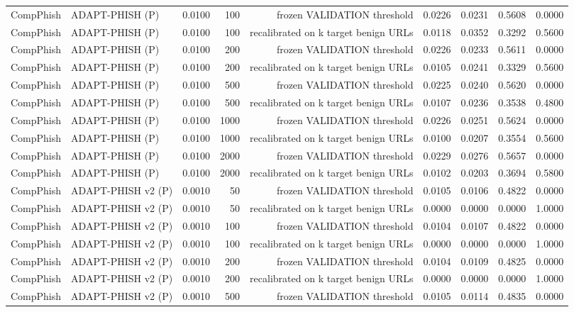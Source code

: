 \begin{table}[t]
\begin{tabular}{llrrrrrrr}
CompPhish & ADAPT-PHISH (P) & 0.0100 & 100 & frozen VALIDATION threshold & 0.0226 & 0.0231 & 0.5608 & 0.0000 \\
CompPhish & ADAPT-PHISH (P) & 0.0100 & 100 & recalibrated on k target benign URLs & 0.0118 & 0.0352 & 0.3292 & 0.5600 \\
CompPhish & ADAPT-PHISH (P) & 0.0100 & 200 & frozen VALIDATION threshold & 0.0226 & 0.0233 & 0.5611 & 0.0000 \\
CompPhish & ADAPT-PHISH (P) & 0.0100 & 200 & recalibrated on k target benign URLs & 0.0105 & 0.0241 & 0.3329 & 0.5600 \\
CompPhish & ADAPT-PHISH (P) & 0.0100 & 500 & frozen VALIDATION threshold & 0.0225 & 0.0240 & 0.5620 & 0.0000 \\
CompPhish & ADAPT-PHISH (P) & 0.0100 & 500 & recalibrated on k target benign URLs & 0.0107 & 0.0236 & 0.3538 & 0.4800 \\
CompPhish & ADAPT-PHISH (P) & 0.0100 & 1000 & frozen VALIDATION threshold & 0.0226 & 0.0251 & 0.5624 & 0.0000 \\
CompPhish & ADAPT-PHISH (P) & 0.0100 & 1000 & recalibrated on k target benign URLs & 0.0100 & 0.0207 & 0.3554 & 0.5600 \\
CompPhish & ADAPT-PHISH (P) & 0.0100 & 2000 & frozen VALIDATION threshold & 0.0229 & 0.0276 & 0.5657 & 0.0000 \\
CompPhish & ADAPT-PHISH (P) & 0.0100 & 2000 & recalibrated on k target benign URLs & 0.0102 & 0.0203 & 0.3694 & 0.5800 \\
CompPhish & ADAPT-PHISH v2 (P) & 0.0010 & 50 & frozen VALIDATION threshold & 0.0105 & 0.0106 & 0.4822 & 0.0000 \\
CompPhish & ADAPT-PHISH v2 (P) & 0.0010 & 50 & recalibrated on k target benign URLs & 0.0000 & 0.0000 & 0.0000 & 1.0000 \\
CompPhish & ADAPT-PHISH v2 (P) & 0.0010 & 100 & frozen VALIDATION threshold & 0.0104 & 0.0107 & 0.4822 & 0.0000 \\
CompPhish & ADAPT-PHISH v2 (P) & 0.0010 & 100 & recalibrated on k target benign URLs & 0.0000 & 0.0000 & 0.0000 & 1.0000 \\
CompPhish & ADAPT-PHISH v2 (P) & 0.0010 & 200 & frozen VALIDATION threshold & 0.0104 & 0.0109 & 0.4825 & 0.0000 \\
CompPhish & ADAPT-PHISH v2 (P) & 0.0010 & 200 & recalibrated on k target benign URLs & 0.0000 & 0.0000 & 0.0000 & 1.0000 \\
CompPhish & ADAPT-PHISH v2 (P) & 0.0010 & 500 & frozen VALIDATION threshold & 0.0105 & 0.0114 & 0.4835 & 0.0000 \\

\end{tabular}
\end{table}
